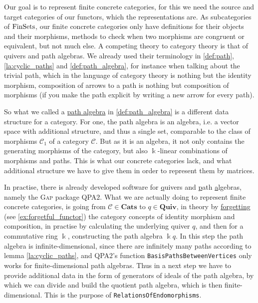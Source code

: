 
Our goal is to represent finite concrete categories, for this we need the source and target categories of our functors, which the
representations are.
As subcategories of $\textup{FinSets}$, our finite concrete categories only have definitions for their objects and their
morphisms, methods to check when two morphisms are congruent or equivalent, but not much else.
A competing theory to category theory is that of quivers and path algebras. We already used their terminology in
\ref{def:path}, \ref{la:cyclic_paths} and \ref{def:path_algebra}, for instance when talking about the trivial path,
which in the language of category theory is nothing but the identity morphism, composition of arrows to a path is nothing but
composition of morphisms (if you make the path explicit by writing a new arrow for every path).

So what we called a \ul{path algebra} in \ref{def:path_algebra} is a different data structure for a category. 
For one, the path algebra is an algebra, i.e. a vector space with additional structure, and thus a single set, comparable to the
class of morphisms $\mathcal{C}_{1}$ of a category $\mathcal{C}$.
But as it is an algebra, it not only contains the generating morphisms of the category, but also $\Bbbk$-linear combinations of
morphisms and paths. This is what our concrete categories lack, and what additional structure we have to give them in order
to represent them by matrices.

In practise, there is already developed software for \ul{q}uivers and \ul{p}ath \ul{a}lgebras, namely the \textsc{Gap} package
\textsc{QPA$2$}.
What we are actually doing to represent finite concrete categories, is going from $\mathcal{C} \in \mathbf{Cats}$ to $q \in \mathbf{Quiv}$,
in theory by \ul{forgetting} (see \ref{ex:forgetful_functor}) the category concepts of identity morphism and composition, in practise by calculating the
underlying quiver $q$, and then for a commutative ring $\Bbbk$, constructing the path algebra $\Bbbk q$. In this step the path algebra
is infinite-dimensional, since there are infinitely many paths according to lemma \ref{la:cyclic_paths}, and \textsc{QPA$2$}'s function
\texttt{BasisPathsBetweenVertices} only works for finite-dimensional path algebras. Thus in a next step we have to provide
additional data in the form of generators of ideals of the path algebra, by which we can divide and build the quotient path algebra,
which is then finite-dimensional. This is the purpose of \texttt{RelationsOfEndomorphisms}.

